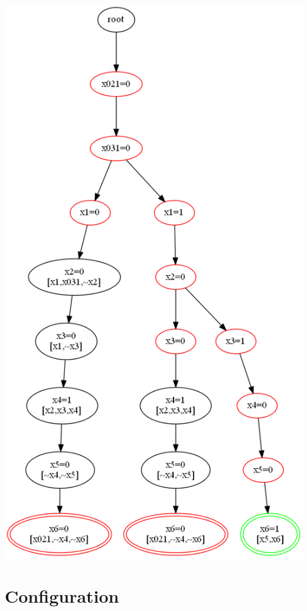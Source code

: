 \documentclass[11pt]{article}
\begin{document}
\begin{center}
\includegraphics[keepaspectratio=true,height=.7\textheight]{tree1}
\end{center}

\vfill

\newpage

\section{Configuration}
\end{document}

